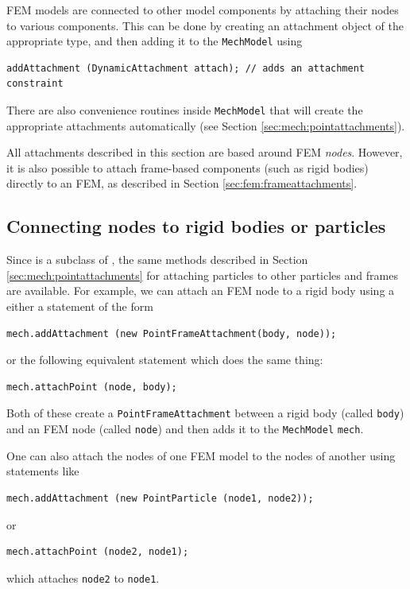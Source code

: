 FEM models are connected to other model components by attaching their
nodes to various components. This can be done by creating
an attachment object of the appropriate type, and then 
adding it to the {\tt MechModel} using
\begin{lstlisting}[]
  addAttachment (DynamicAttachment attach); // adds an attachment constraint
\end{lstlisting}
There are also convenience routines inside {\tt MechModel} that will create
the appropriate attachments automatically (see Section 
\ref{sec:mech:pointattachments}).

All attachments described in this section are based around FEM {\it
nodes}. However, it is also possible to attach frame-based components
(such as rigid bodies) directly to an FEM, as described in
Section \ref{sec:fem:frameattachments}.

\subsection{Connecting nodes to rigid bodies or particles}

Since
 is a subclass of
, the same methods
described in Section \ref{sec:mech:pointattachments} for attaching 
particles to other particles and frames are available. For example, 
we can attach an FEM node to a rigid body using a
either a statement of the form
%
\begin{lstlisting}[]
   mech.addAttachment (new PointFrameAttachment(body, node));
\end{lstlisting}
%
or the following equivalent statement which does the same thing:
%
\begin{lstlisting}[]
   mech.attachPoint (node, body);
\end{lstlisting}
%
Both of these create a {\tt PointFrameAttachment} between a rigid body (called
{\tt body}) and an FEM node (called {\tt node}) and then adds it to
the {\tt MechModel} {\tt mech}.

One can also attach the nodes of one FEM model to the nodes of another
using statements like
%
\begin{lstlisting}[]
   mech.addAttachment (new PointParticle (node1, node2));
\end{lstlisting}
%
or
%
\begin{lstlisting}[]
   mech.attachPoint (node2, node1);
\end{lstlisting}
%
which attaches {\tt node2} to {\tt node1}.

